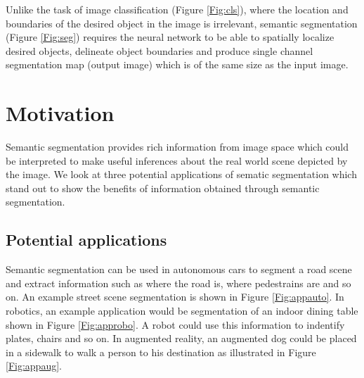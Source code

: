 Unlike the task of image classification (Figure \ref{Fig:cls}), where the location and boundaries of the desired object in the image is irrelevant, semantic segmentation (Figure \ref{Fig:seg}) requires the neural network to be able to spatially localize desired objects, delineate object boundaries and produce single channel segmentation map (output image) which is of the same size as the input image.

\section{Motivation}

Semantic segmentation provides rich information from image space which could be interpreted to make useful inferences about the real world scene depicted by the image. We look at three potential applications of sematic segmentation which stand out to show the benefits of information obtained through semantic segmentation. 

\subsection{Potential applications}

Semantic segmentation can be used in autonomous cars to segment a road scene and extract information such as where the road is, where pedestrains are and so on. An example street scene segmentation is shown in Figure \ref{Fig:appauto}. In robotics, an example application would be segmentation of an indoor dining table shown in Figure \ref{Fig:approbo}. A robot could use this information to indentify plates, chairs and so on. In augmented reality, an augmented dog could be placed in a sidewalk to walk a person to his destination as illustrated in Figure \ref{Fig:appaug}. 


